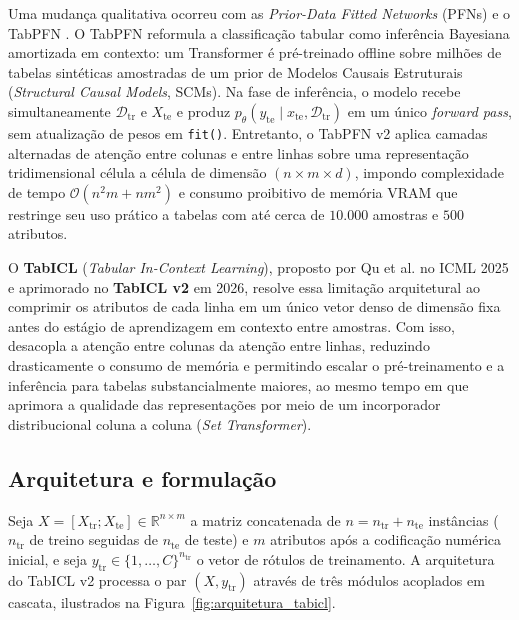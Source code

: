 \documentclass[11pt,a4paper]{article}
\begin{document}
Uma mudança qualitativa ocorreu com as \emph{Prior-Data Fitted Networks} (PFNs) e o TabPFN \cite{hollmann2023tabpfn,hollmann2025tabpfn}. O TabPFN reformula a classificação tabular como inferência Bayesiana amortizada em contexto: um Transformer é pré-treinado offline sobre milhões de tabelas sintéticas amostradas de um prior de Modelos Causais Estruturais (\emph{Structural Causal Models}, SCMs). Na fase de inferência, o modelo recebe simultaneamente $\mathcal{D}_{\mathrm{tr}}$ e $X_{\mathrm{te}}$ e produz $p_\theta(y_{\mathrm{te}} \mid x_{\mathrm{te}}, \mathcal{D}_{\mathrm{tr}})$ em um único \emph{forward pass}, sem atualização de pesos em \texttt{fit()}. Entretanto, o TabPFN v2 aplica camadas alternadas de atenção entre colunas e entre linhas sobre uma representação tridimensional célula a célula de dimensão $(n \times m \times d)$, impondo complexidade de tempo $\mathcal{O}(n^2 m + n m^2)$ e consumo proibitivo de memória VRAM que restringe seu uso prático a tabelas com até cerca de $10.000$ amostras e $500$ atributos.

O \textbf{TabICL} (\emph{Tabular In-Context Learning}), proposto por Qu et al. \cite{qu2025tabicl} no ICML 2025 e aprimorado no \textbf{TabICL v2} \cite{qu2026tabiclv2} em 2026, resolve essa limitação arquitetural ao comprimir os atributos de cada linha em um único vetor denso de dimensão fixa antes do estágio de aprendizagem em contexto entre amostras. Com isso, desacopla a atenção entre colunas da atenção entre linhas, reduzindo drasticamente o consumo de memória e permitindo escalar o pré-treinamento e a inferência para tabelas substancialmente maiores, ao mesmo tempo em que aprimora a qualidade das representações por meio de um incorporador distribucional coluna a coluna (\emph{Set Transformer}).

\subsection{Arquitetura e formulação}
\label{sec:arquitetura}

Seja $X = [X_{\mathrm{tr}}; X_{\mathrm{te}}] \in \mathbb{R}^{n \times m}$ a matriz concatenada de $n = n_{\mathrm{tr}} + n_{\mathrm{te}}$ instâncias ($n_{\mathrm{tr}}$ de treino seguidas de $n_{\mathrm{te}}$ de teste) e $m$ atributos após a codificação numérica inicial, e seja $y_{\mathrm{tr}} \in \{1, \dots, C\}^{n_{\mathrm{tr}}}$ o vetor de rótulos de treinamento. A arquitetura do TabICL v2 processa o par $(X, y_{\mathrm{tr}})$ através de três módulos acoplados em cascata, ilustrados na Figura~\ref{fig:arquitetura_tabicl}.
\end{document}
